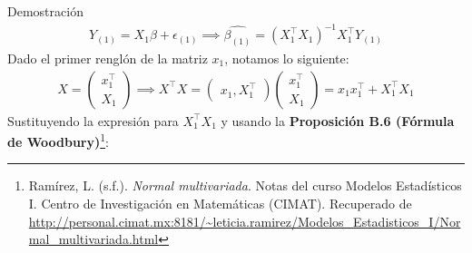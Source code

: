 \documentclass[a4paper,11pt]{article}
\begin{document}
\begin{demostracion}{Demostración}
\begin{align*}
        Y_{(1)}=X_1\beta+\epsilon_{(1)}\implies \hat{\beta_{(1)} }=\left(X_1^\top X_1 \right)^{-1}X_1^\top Y_{(1)}
    \end{align*}
    Dado el primer renglón de la matriz $x_1$, notamos  lo siguiente:
    \begin{align*}
        X=\begin{pmatrix}
              x_1^\top \\
              X_1
          \end{pmatrix}\implies X^\top X=\begin{pmatrix}
                                             x_1,X_1^\top
                                         \end{pmatrix}\begin{pmatrix}
                                                          x_1^\top \\
                                                          X_1
                                                      \end{pmatrix}=x_1x_1^\top +X_1^\top X_1
    \end{align*}
    Sustituyendo la expresión para $X_{1} ^\top X_1$ y usando la \textbf{Proposición B.6 (Fórmula de Woodbury)}\footnote{Ramírez, L. (s.f.). \textit{Normal multivariada}. Notas del curso Modelos Estadísticos I. Centro de Investigación en Matemáticas (CIMAT). Recuperado de \url{http://personal.cimat.mx:8181/~leticia.ramirez/Modelos_Estadisticos_I/Normal_multivariada.html}}:


\end{demostracion}
\end{document}
